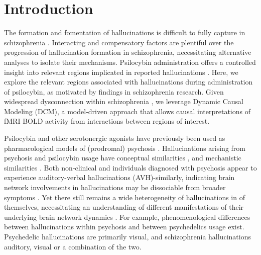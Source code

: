 \documentclass{article}
\begin{document}

\makenomenclature
\renewcommand{\nomname}{Abbreviations}

\printnomenclature

\section{Introduction}

The formation and fomentation of hallucinations is difficult to fully capture in schizophrenia \citep{powers2025computational}. Interacting and compensatory factors are plentiful over the progression of hallucination formation in schizophrenia, necessitating alternative analyses to isolate their mechanisms. Psilocybin administration offers a controlled insight into relevant regions implicated in reported hallucinations \citep{waters_future_2023}. Here, we explore the relevant regions associated with hallucinations during administration of psilocybin, as motivated by findings in schizophrenia research. Given widespread dysconnection within schizophrenia \citep{oneill_dysconnectivity_2019, dong_dysfunction_2018}, we leverage Dynamic Causal Modeling (DCM), a model-driven approach that allows causal interpretations of fMRI BOLD activity from interactions between regions of interest. 

Psilocybin and other serotonergic agonists have previously been used as pharmacological models of (prodromal) psychosis \citep{carhart-harris_functional_2013}. Hallucinations arising from psychosis and psilocybin usage have conceptual similarities \citep{leptourgos_hallucinations_2020}, and mechanistic similarities \citep{llado-pelfort_effects_2018}. Both non-clinical and individuals diagnosed with psychosis appear to experience auditory-verbal hallucinations (AVH)-similarly, indicating brain network involvements in hallucinations may be dissociable from broader symptoms \citep{diederen2012auditory}. Yet there still remains a wide heterogeneity of hallucinations in of themselves, necessitating an understanding of different manifestations of their underlying brain network dynamics \citep{waters_auditory_2012}. For example, phenomenological differences between hallucinations within psychosis and between psychedelics usage exist. Psychedelic hallucinations are primarily visual, and schizophrenia hallucinations auditory, visual or a combination of the two\citep{stoliker_neural_2025, leptourgos_hallucinations_2020}. 
\end{document}
